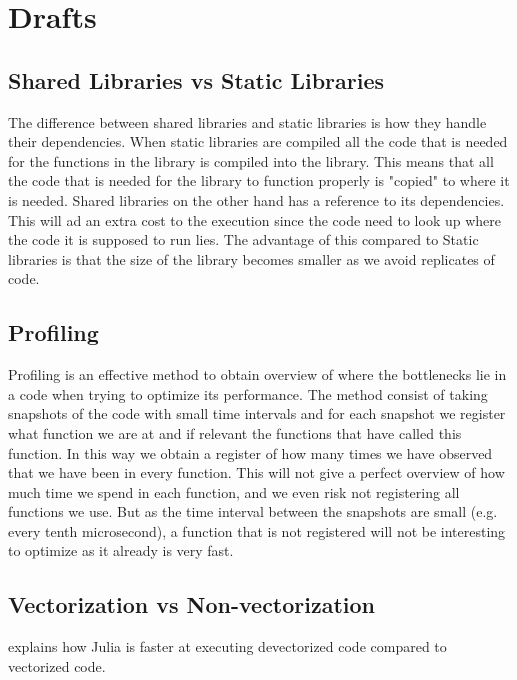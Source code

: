\chapter{Drafts}
\section{Shared Libraries vs Static Libraries}
The difference between shared libraries and static libraries is how they handle their dependencies. When static libraries are compiled all the code that is needed for the functions in the library is compiled into the library. This means that all the code that is needed for the library to function properly is "copied" to where it is needed. Shared libraries on the other hand has a reference to its dependencies. This will ad an extra cost to the execution since the code need to look up where the code it is supposed to run lies. The advantage of this compared to Static libraries is that the size of the library becomes smaller as we avoid replicates of code.

\section{Profiling}
Profiling is an effective method to obtain overview of where the bottlenecks lie in a code when trying to optimize its performance. The method consist of taking snapshots of the code with small time intervals and for each snapshot we register what function we are at and if relevant the functions that have called this function. In this way we obtain a register of how many times we have observed that we have been in every function. This will not give a perfect overview of how much time we spend in each function, and we even risk not registering all functions we use. But as the time interval between the snapshots are small (e.g. every tenth microsecond), a function that is not registered will not be interesting to optimize as it already is very fast. 

\section{Vectorization vs Non-vectorization}
\emph{\citep{Vectorization}} explains how Julia is faster at executing devectorized code compared to vectorized code.
